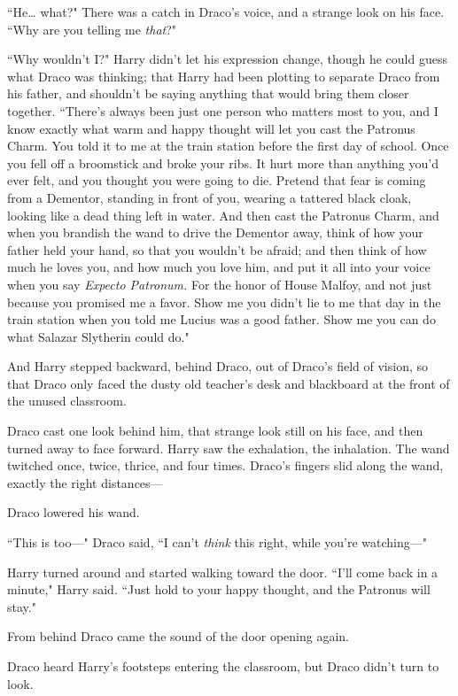 ``He{\ldots} what?" There was a catch in Draco's voice, and a strange look on his face. ``Why are you telling me \emph{that}?"

``Why wouldn't I?" Harry didn't let his expression change, though he could guess what Draco was thinking; that Harry had been plotting to separate Draco from his father, and shouldn't be saying anything that would bring them closer together. ``There's always been just one person who matters most to you, and I know exactly what warm and happy thought will let you cast the Patronus Charm. You told it to me at the train station before the first day of school. Once you fell off a broomstick and broke your ribs. It hurt more than anything you'd ever felt, and you thought you were going to die. Pretend that fear is coming from a Dementor, standing in front of you, wearing a tattered black cloak, looking like a dead thing left in water. And then cast the Patronus Charm, and when you brandish the wand to drive the Dementor away, think of how your father held your hand, so that you wouldn't be afraid; and then think of how much he loves you, and how much you love him, and put it all into your voice when you say \emph{Expecto Patronum.} For the honor of House Malfoy, and not just because you promised me a favor. Show me you didn't lie to me that day in the train station when you told me Lucius was a good father. Show me you can do what Salazar Slytherin could do."

And Harry stepped backward, behind Draco, out of Draco's field of vision, so that Draco only faced the dusty old teacher's desk and blackboard at the front of the unused classroom.

Draco cast one look behind him, that strange look still on his face, and then turned away to face forward. Harry saw the exhalation, the inhalation. The wand twitched once, twice, thrice, and four times. Draco's fingers slid along the wand, exactly the right distances—

Draco lowered his wand.

``This is too—" Draco said, ``I can't \emph{think} this right, while you're watching—"

Harry turned around and started walking toward the door. ``I'll come back in a minute," Harry said. ``Just hold to your happy thought, and the Patronus will stay."

\later

From behind Draco came the sound of the door opening again.

Draco heard Harry's footsteps entering the classroom, but Draco didn't turn to look.

